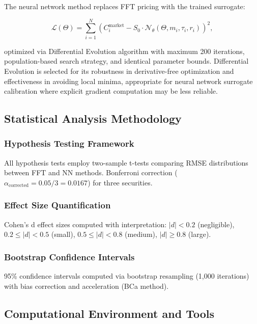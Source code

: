 \documentclass[12pt,a4paper]{article}
\begin{document}
The neural network method replaces FFT pricing with the trained surrogate:

\begin{equation}
\mathcal{L}(\Theta) = \sum_{i=1}^N (C_i^{\text{market}} - S_0 \cdot \mathcal{N}_\theta(\Theta, m_i, \tau_i, r_i))^2,
\end{equation}

optimized via Differential Evolution algorithm with maximum 200 iterations, population-based search strategy, and identical parameter bounds. Differential Evolution is selected for its robustness in derivative-free optimization and effectiveness in avoiding local minima, appropriate for neural network surrogate calibration where explicit gradient computation may be less reliable.

\subsection{Statistical Analysis Methodology}

\subsubsection{Hypothesis Testing Framework}

All hypothesis tests employ two-sample t-tests comparing RMSE distributions between FFT and NN methods. Bonferroni correction ($\alpha_{\text{corrected}} = 0.05 / 3 = 0.0167$) for three securities.

\subsubsection{Effect Size Quantification}

Cohen's d effect sizes computed with interpretation: $|d| < 0.2$ (negligible), $0.2 \leq |d| < 0.5$ (small), $0.5 \leq |d| < 0.8$ (medium), $|d| \geq 0.8$ (large).

\subsubsection{Bootstrap Confidence Intervals}

95\% confidence intervals computed via bootstrap resampling (1,000 iterations) with bias correction and acceleration (BCa method).

\subsection{Computational Environment and Tools}
\end{document}
